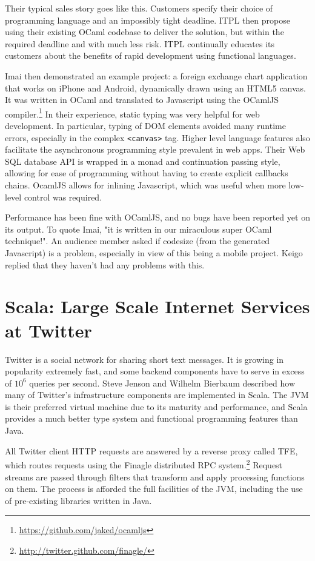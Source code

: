 \documentclass{jfp1}
\begin{document}
Their typical sales story goes like this. Customers specify their choice of
programming language and an impossibly tight deadline.  ITPL then propose using
their existing OCaml codebase to deliver the solution, but within the required
deadline and with much less risk.  ITPL continually educates its customers
about the benefits of rapid development using functional languages.

Imai then demonstrated an example project: a foreign exchange chart application
that works on iPhone and Android, dynamically drawn using an HTML5 canvas.  It
was written in OCaml and translated to Javascript using the OCamlJS
compiler.\footnote{\url{https://github.com/jaked/ocamljs}}  In their
experience, static typing was very helpful for web development.  In particular,
typing of DOM elements avoided many runtime errors, especially in the complex
{\tt <canvas>} tag.  Higher level language features also facilitate the
asynchronous programming style prevalent in web apps.  Their Web SQL database
API is wrapped in a monad and continuation passing style, allowing
for ease of programming without having to create explicit callbacks chains.
OcamlJS allows for inlining Javascript, which was useful when more low-level
control was required.

Performance has been fine with OCamlJS, and no bugs have been reported yet on
its output. To quote Imai, "it is written in our miraculous super OCaml
technique!". An audience member asked if codesize (from the generated
Javascript) is a problem, especially in view of this being a mobile project.
Keigo replied that they haven't had any problems with this.

\section{Scala: Large Scale Internet Services at Twitter}

Twitter is a social network for sharing short text messages. It is growing in
popularity extremely fast, and some backend components have to serve in excess
of $10^6$ queries per second.  Steve Jenson and Wilhelm Bierbaum described how
many of Twitter's infrastructure components are implemented in Scala.  The JVM
is their preferred virtual machine due to its maturity and performance, and Scala
provides a much better type system and functional programming features than
Java.

All Twitter client HTTP requests are answered by a reverse proxy called TFE,
which routes requests using the Finagle distributed RPC
system.\footnote{\url{http://twitter.github.com/finagle/}} Request streams are
passed through filters that transform and apply processing functions on them.
The process is afforded the full facilities of the JVM, including the use of
pre-existing libraries written in Java.
\end{document}
